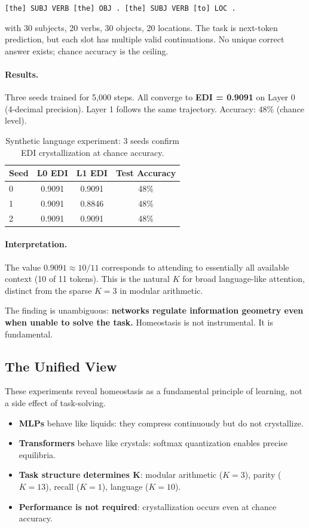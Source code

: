 \begin{center}
\texttt{[the] SUBJ VERB [the] OBJ . [the] SUBJ VERB [to] LOC .}
\end{center}

with 30 subjects, 20 verbs, 30 objects, 20 locations. The task is next-token prediction, but each slot has multiple valid continuations. No unique correct answer exists; chance accuracy is the ceiling.

\paragraph{Results.}
Three seeds trained for 5,000 steps. All converge to \textbf{EDI = 0.9091} on Layer 0 (4-decimal precision). Layer 1 follows the same trajectory. Accuracy: 48\% (chance level).

\begin{table}[h]
\centering
\caption{Synthetic language experiment: 3 seeds confirm EDI crystallization at chance accuracy.}
\label{tab:synthetic-lang}
\begin{tabular}{lccc}
\toprule
Seed & L0 EDI & L1 EDI & Test Accuracy \\
\midrule
0 & 0.9091 & 0.9091 & 48\% \\
1 & 0.9091 & 0.8846 & 48\% \\
2 & 0.9091 & 0.9091 & 48\% \\
\bottomrule
\end{tabular}
\end{table}

\paragraph{Interpretation.}
The value $0.9091 \approx 10/11$ corresponds to attending to essentially all available context (10 of 11 tokens). This is the natural $K$ for broad language-like attention, distinct from the sparse $K=3$ in modular arithmetic.

The finding is unambiguous: \textbf{networks regulate information geometry even when unable to solve the task.} Homeostasis is not instrumental. It is fundamental.

\subsection{The Unified View}
These experiments reveal homeostasis as a fundamental principle of learning, not a side effect of task-solving.
\begin{itemize}
    \item \textbf{MLPs} behave like liquids: they compress continuously but do not crystallize.
    \item \textbf{Transformers} behave like crystals: softmax quantization enables precise equilibria.
    \item \textbf{Task structure determines K}: modular arithmetic ($K=3$), parity ($K=13$), recall ($K=1$), language ($K=10$).
    \item \textbf{Performance is not required}: crystallization occurs even at chance accuracy.
\end{itemize}

